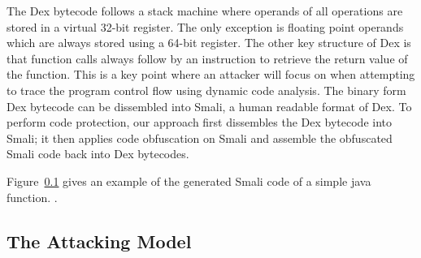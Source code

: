  The Dex bytecode follows a stack machine where
operands of all operations are stored in a virtual 32-bit register. The only
exception is floating point operands which are always stored using a 64-bit
register. The other key structure of Dex is that function calls always follow by
an instruction to retrieve the return value
of the function. This is a key point where an attacker will focus on when attempting to trace the program control flow using dynamic code analysis.
The binary form Dex bytecode can be dissembled into Smali, a
human readable format of Dex.
To perform code protection, our approach first dissembles the Dex bytecode into Smali;
it then applies code obfuscation on Smali and assemble the obfuscated Smali code back into Dex bytecodes. 

Figure~\ref{} gives an example of the generated Smali code of a simple java
function. .



%
%


\subsection{The Attacking Model}

